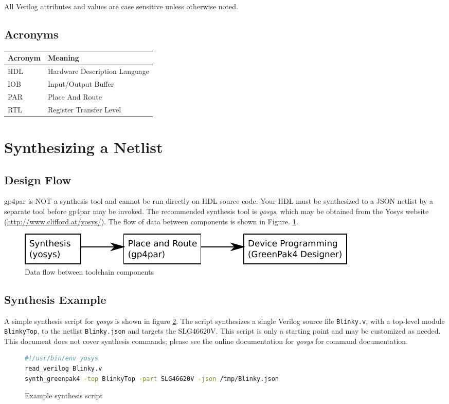 \documentclass{article}
\begin{document}
All Verilog attributes and values are case sensitive unless otherwise noted.

\subsection{Acronyms}

\begin{tabularx}{4in}{|l|X|}
\hline
{\bfseries Acronym} & {\bfseries Meaning} \\
\hline
HDL & Hardware Description Language \\
\hline
IOB & Input/Output Buffer \\
\hline
PAR & Place And Route \\
\hline
RTL & Register Transfer Level \\
\hline
\end{tabularx}

\pagebreak
\section{Synthesizing a Netlist}

\subsection{Design Flow}

gp4par is NOT a synthesis tool and cannot be run directly on HDL source code. Your HDL must be synthesized to
a JSON netlist by a separate tool before gp4par may be invoked. The recommended synthesis tool is 
\emph{yosys}, which may be obtained from the Yosys website (\url{http://www.clifford.at/yosys/}). The flow of data 
between components is shown in Figure. \ref{flow}.

\begin{figure}[h]
\centering
\includegraphics[scale=1]{figures/flow.pdf}
\caption{Data flow between toolchain components}
\label{flow}
\end{figure}

\subsection{Synthesis Example}

A simple synthesis script for \emph{yosys} is shown in figure \ref{yscript}. The script synthesizes a single Verilog 
source file \texttt{Blinky.v}, with a top-level module \texttt{BlinkyTop}, to the netlist \texttt{Blinky.json} and 
targets the SLG46620V. This script is only a starting point and may be customized as needed. This document does not
cover synthesis commands; please see the online documentation for \emph{yosys} for command documentation.
\begin{figure}[h]
\begin{lstlisting}[language=sh]
#!/usr/bin/env yosys
read_verilog Blinky.v
synth_greenpak4 -top BlinkyTop -part SLG46620V -json /tmp/Blinky.json
\end{lstlisting}
\caption{Example synthesis script}
\label{yscript}
\end{figure}
\end{document}
